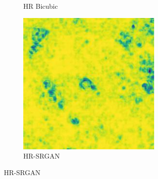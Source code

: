 \begin{figure}[H]
\begin{subfigure}[b]{0.275\textwidth}
    \caption{HR Bicubic}
  \end{subfigure}
  \begin{subfigure}[b]{0.275\textwidth}
    \includegraphics[width=\textwidth]{Chapter7/SSIM_srgan_9.jpg}
    \caption{HR-SRGAN}
  \end{subfigure}
  

\end{figure}
